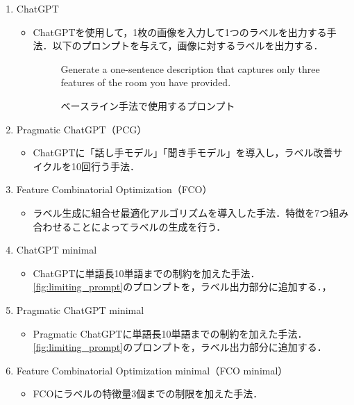 \documentclass[a4paper,11pt]{jreport}
\begin{document}
\begin{enumerate}
  \item ChatGPT
  \begin{itemize}
  \item ChatGPTを使用して，1枚の画像を入力して1つのラベルを出力する手法．以下のプロンプトを与えて，画像に対するラベルを出力する．
  \begin{figure}[H]
    \begin{mdframed}[linewidth=1pt]
      Generate a one-sentence description that captures only three features of the room you have provided.
    \end{mdframed}
    \caption{ベースライン手法で使用するプロンプト}
    \label{fig:baseline_prompt}
  \end{figure}
\end{itemize}
  
  \item Pragmatic ChatGPT（PCG）
  \begin{itemize}
    \item ChatGPTに「話し手モデル」「聞き手モデル」を導入し，ラベル改善サイクルを10回行う手法．
  \end{itemize}
  
  \item Feature Combinatorial Optimization（FCO）
  \begin{itemize}
    \item ラベル生成に組合せ最適化アルゴリズムを導入した手法．特徴を7つ組み合わせることによってラベルの生成を行う．
  \end{itemize}
  
  \item ChatGPT minimal
  \begin{itemize}
    \item ChatGPTに単語長10単語までの制約を加えた手法．\ref{fig:limiting_prompt}のプロンプトを，ラベル出力部分に追加する．，
  \end{itemize}
  
  \item Pragmatic ChatGPT minimal
  \begin{itemize}
    \item Pragmatic ChatGPTに単語長10単語までの制約を加えた手法．\ref{fig:limiting_prompt}のプロンプトを，ラベル出力部分に追加する．
  \end{itemize}
  
  \item Feature Combinatorial Optimization minimal（FCO minimal）
  \begin{itemize}
    \item FCOにラベルの特徴量3個までの制限を加えた手法．
  \end{itemize}
\end{enumerate}
\end{document}
